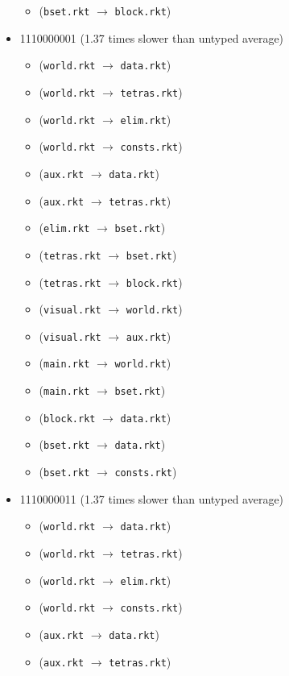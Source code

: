\documentclass{article}
\newcommand{\mono}[1]{\texttt{#1}}
\begin{document}
\begin{itemize}
\begin{itemize}
  \item (\mono{bset.rkt} $\rightarrow$ \mono{block.rkt})
  \end{itemize}
\item 1110000001 (1.37 times slower than untyped average)
  \begin{itemize}
  \item (\mono{world.rkt} $\rightarrow$ \mono{data.rkt})
  \item (\mono{world.rkt} $\rightarrow$ \mono{tetras.rkt})
  \item (\mono{world.rkt} $\rightarrow$ \mono{elim.rkt})
  \item (\mono{world.rkt} $\rightarrow$ \mono{consts.rkt})
  \item (\mono{aux.rkt} $\rightarrow$ \mono{data.rkt})
  \item (\mono{aux.rkt} $\rightarrow$ \mono{tetras.rkt})
  \item (\mono{elim.rkt} $\rightarrow$ \mono{bset.rkt})
  \item (\mono{tetras.rkt} $\rightarrow$ \mono{bset.rkt})
  \item (\mono{tetras.rkt} $\rightarrow$ \mono{block.rkt})
  \item (\mono{visual.rkt} $\rightarrow$ \mono{world.rkt})
  \item (\mono{visual.rkt} $\rightarrow$ \mono{aux.rkt})
  \item (\mono{main.rkt} $\rightarrow$ \mono{world.rkt})
  \item (\mono{main.rkt} $\rightarrow$ \mono{bset.rkt})
  \item (\mono{block.rkt} $\rightarrow$ \mono{data.rkt})
  \item (\mono{bset.rkt} $\rightarrow$ \mono{data.rkt})
  \item (\mono{bset.rkt} $\rightarrow$ \mono{consts.rkt})
  \end{itemize}
\item 1110000011 (1.37 times slower than untyped average)
  \begin{itemize}
  \item (\mono{world.rkt} $\rightarrow$ \mono{data.rkt})
  \item (\mono{world.rkt} $\rightarrow$ \mono{tetras.rkt})
  \item (\mono{world.rkt} $\rightarrow$ \mono{elim.rkt})
  \item (\mono{world.rkt} $\rightarrow$ \mono{consts.rkt})
  \item (\mono{aux.rkt} $\rightarrow$ \mono{data.rkt})
  \item (\mono{aux.rkt} $\rightarrow$ \mono{tetras.rkt})

\end{itemize}
\end{itemize}
\end{document}
